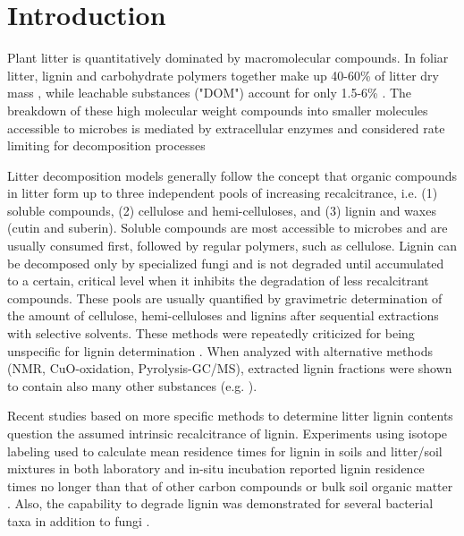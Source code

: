 \section*{Introduction}

Plant litter is quantitatively dominated by macromolecular compounds. In foliar litter, lignin and carbohydrate polymers together make up 40-60\% of litter dry mass \cite{Berg2008}, while leachable substances ("DOM") account for only 1.5-6\% \cite{Don2005}. The breakdown of these high molecular weight compounds into smaller molecules accessible to microbes is mediated by extracellular enzymes and considered rate limiting for decomposition processes \cite{Sinsabaugh2010}

Litter decomposition models generally follow the concept that organic compounds in litter form up to three independent pools of increasing recalcitrance, i.e. (1) soluble compounds, (2) cellulose and hemi-celluloses, and (3) lignin and waxes (cutin and suberin). Soluble compounds are most accessible to microbes and are usually consumed first, followed by regular polymers, such as cellulose. Lignin can be decomposed only by specialized fungi and is not degraded until accumulated to a certain, critical level when it inhibits the degradation of less recalcitrant compounds\cite{Berg1980, Couteaux1995, Moorhead2006, Adair2008}. These pools are usually quantified by gravimetric determination of the amount of cellulose, hemi-celluloses and lignins after sequential extractions with selective solvents. These methods were repeatedly criticized for being unspecific for lignin determination \cite{Hatfield2005}. When analyzed with alternative methods (NMR, CuO-oxidation, Pyrolysis-GC/MS), extracted lignin fractions were shown to contain also many other substances (e.g. \cite{Preston1997}).

Recent studies based on more specific methods to determine litter lignin contents question the assumed intrinsic recalcitrance of lignin. Experiments using isotope labeling used to calculate mean residence times for lignin in soils and litter/soil mixtures in both laboratory and in-situ incubation reported lignin residence times no longer than that of other carbon compounds or bulk soil organic matter \cite{Thevenot2010a, Bol2009}. Also, the capability to degrade lignin was demonstrated for several bacterial taxa in addition to fungi \cite{Bugg2011}.

